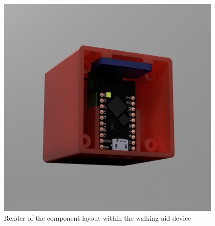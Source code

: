 \begin{figure}[H]
	\centering
	\captionsetup{width=1.0\linewidth}


	\includegraphics[width=0.75\linewidth]{graphics/cad/walkingaid_interior_1.png}

	\caption[Walking Aid Assembled Components Layout]{Render of the component layout within the walking aid device}

	\label{fig:walkingaid_interior_1}

\end{figure}